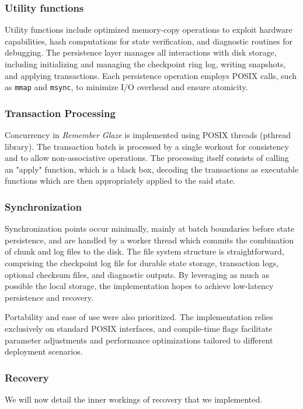 \documentclass[conference]{IEEEtran}
\begin{document}
\subsubsection{Utility functions}
Utility functions include optimized memory-copy operations to exploit hardware capabilities, hash computations for state verification, and diagnostic routines for debugging. The persistence layer manages all interactions with disk storage, including initializing and managing the checkpoint ring log, writing snapshots, and applying transactions. Each persistence operation employs POSIX calls, such as \texttt{mmap} and \texttt{msync}, to minimize I/O overhead and ensure atomicity.
\subsubsection{Transaction Processing}
Concurrency in \textit{Remember Glaze} is implemented using POSIX threads (pthread library). The transaction batch is processed by a single workout for consistency and to allow non-associative operations. The processing itself consists of calling an "apply" function, which is a black box, decoding the transactions as executable functions which are then appropriately applied to the said state. 
\subsubsection{Synchronization}
Synchronization points occur minimally, mainly at batch boundaries before state persistence, and are handled by a worker thread which commits the combination of chunk and log files to the disk.
The file system structure is straightforward, comprising the checkpoint log file for durable state storage, transaction logs, optional checksum files, and diagnostic outputs. By leveraging as much as possible the local storage, the implementation hopes to achieve low-latency persistence and recovery.

Portability and ease of use were also prioritized. The implementation relies exclusively on standard POSIX interfaces, and compile-time flags facilitate parameter adjustments and performance optimizations tailored to different deployment scenarios.


\subsubsection{Recovery}
We will now detail the inner workings of recovery that we implemented.
\end{document}
